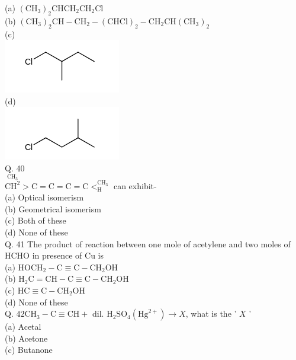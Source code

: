 \documentclass[10pt]{article}
\begin{document}
(a) $\left(\mathrm{CH}_{3}\right)_{2} \mathrm{CHCH}_{2} \mathrm{CH}_{2} \mathrm{Cl}$\\
(b) $\left(\mathrm{CH}_{3}\right)_{2} \mathrm{CH}-\mathrm{CH}_{2}-(\mathrm{CHCl})_{2}-\mathrm{CH}_{2} \mathrm{CH}\left(\mathrm{CH}_{3}\right)_{2}$\\
(c)\\
\includegraphics{smile-113dc330a1dcc1ddaeeed918bc43243276c5e0a8}\\
(d)\\
\includegraphics{smile-0b45a41c322144e64a3fc878b50c5bb21a4a5cfb}\\
Q. 40\\
$\stackrel{\mathrm{CH}_{3}}{\mathrm{CH}^{2}}>\mathrm{C}=\mathrm{C}=\mathrm{C}=\mathrm{C}<_{\mathrm{H}}^{\mathrm{CH}_{3}}$ can exhibit-\\
(a) Optical isomerism\\
(b) Geometrical isomerism\\
(c) Both of these\\
(d) None of these\\
Q. 41 The product of reaction between one mole of acetylene and two moles of HCHO in presence of Cu is\\
(a) $\mathrm{HOCH}_{2}-\mathrm{C} \equiv \mathrm{C}-\mathrm{CH}_{2} \mathrm{OH}$\\
(b) $\mathrm{H}_{2} \mathrm{C}=\mathrm{CH}-\mathrm{C} \equiv \mathrm{C}-\mathrm{CH}_{2} \mathrm{OH}$\\
(c) $\mathrm{HC} \equiv \mathrm{C}-\mathrm{CH}_{2} \mathrm{OH}$\\
(d) None of these\\
Q. $42 \mathrm{CH}_{3}-\mathrm{C} \equiv \mathrm{CH}+$ dil. $\mathrm{H}_{2} \mathrm{SO}_{4}\left(\mathrm{Hg}^{2+}\right) \rightarrow X$, what is the ' $X$ '\\
(a) Acetal\\
(b) Acetone\\
(c) Butanone\\
\end{document}
